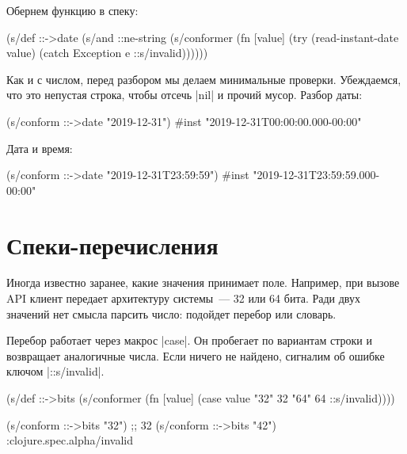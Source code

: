 Обернем функцию в спеку:

\begin{english}
  \begin{clojure}
(s/def ::->date
  (s/and
   ::ne-string
   (s/conformer
    (fn [value]
      (try
        (read-instant-date value)
        (catch Exception e
          ::s/invalid))))))
  \end{clojure}
\end{english}

Как и с числом, перед разбором мы делаем минимальные проверки. Убеждаемся, что
это непустая строка, чтобы отсечь \spverb|nil| и прочий мусор. Разбор даты:

\begin{english}
  \begin{clojure}
(s/conform ::->date "2019-12-31")
#inst "2019-12-31T00:00:00.000-00:00"
  \end{clojure}
\end{english}

\noindent
Дата и время:

\begin{english}
  \begin{clojure}
(s/conform ::->date "2019-12-31T23:59:59")
#inst "2019-12-31T23:59:59.000-00:00"
  \end{clojure}
\end{english}

\section{Спеки-перечисления}

Иногда известно заранее, какие значения принимает поле. Например, при вызове API
клиент передает архитектуру системы~--- 32 или 64 бита. Ради двух значений нет
смысла парсить число: подойдет перебор или словарь.


Перебор работает через макрос \spverb|case|. Он пробегает по вариантам строки и
возвращает аналогичные числа. Если ничего не найдено, сигналим об ошибке ключом
\spverb|::s/invalid|.

\begin{english}
  \begin{clojure}
(s/def ::->bits
  (s/conformer
   (fn [value]
     (case value
       "32" 32
       "64" 64
       ::s/invalid))))

(s/conform ::->bits "32") ;; 32
(s/conform ::->bits "42") :clojure.spec.alpha/invalid
  \end{clojure}
\end{english}

